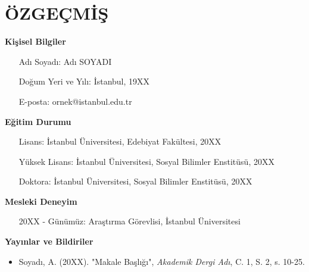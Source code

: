 \chapter*{ÖZGEÇMİŞ}

\noindent\textbf{Kişisel Bilgiler}
\begin{itemize}[leftmargin=2cm]
    \item[Adı Soyadı:] Adı SOYADI
    \item[Doğum Yeri ve Yılı:] İstanbul, 19XX
    \item[E-posta:] ornek@istanbul.edu.tr
\end{itemize}

\vspace{0.5cm}
\noindent\textbf{Eğitim Durumu}
\begin{itemize}[leftmargin=2cm]
    \item[Lisans:] İstanbul Üniversitesi, Edebiyat Fakültesi, 20XX
    \item[Yüksek Lisans:] İstanbul Üniversitesi, Sosyal Bilimler Enstitüsü, 20XX
    \item[Doktora:] İstanbul Üniversitesi, Sosyal Bilimler Enstitüsü, 20XX
\end{itemize}

\vspace{0.5cm}
\noindent\textbf{Mesleki Deneyim}
\begin{itemize}[leftmargin=2cm]
    \item[20XX - Günümüz:] Araştırma Görevlisi, İstanbul Üniversitesi
\end{itemize}

\vspace{0.5cm}
\noindent\textbf{Yayınlar ve Bildiriler}
\begin{itemize}[leftmargin=2cm]
    \item Soyadı, A. (20XX). "Makale Başlığı", \textit{Akademik Dergi Adı}, C. 1, S. 2, s. 10-25.
\end{itemize}
